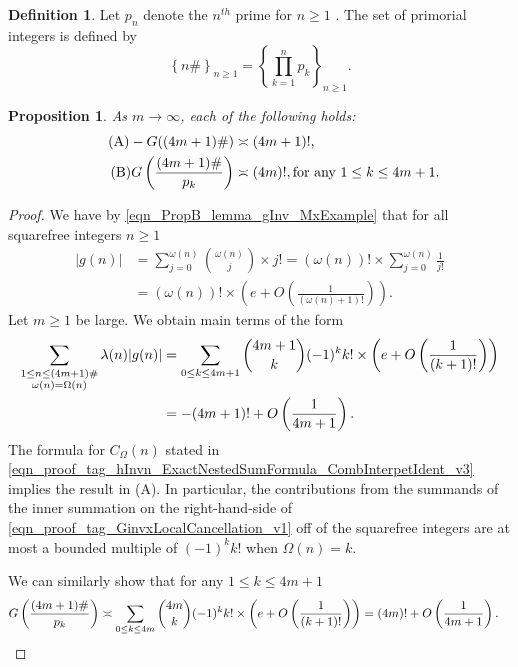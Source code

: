 \documentclass[11pt,reqno,a4letter]{article}
\numberwithin{equation}{section}
\numberwithin{figure}{section}
\numberwithin{table}{section}
\newcommand{\seqnum}[1]{\href{http://oeis.org/#1}{\color{ProcessBlue}{\underline{#1}}}}
\theoremstyle{plain}
\newtheorem{prop}[theorem]{Proposition}
\numberwithin{theorem}{section}
\theoremstyle{definition}
\newtheorem{definition}[theorem]{Definition}
\theoremstyle{remark}
\newcommand{\mathtext}[1]{\text{\rm #1}}
\begin{document}
\begin{definition}
Let $p_n$ denote the $n^{th}$ prime for $n \geq 1$ 
\cite[\seqnum{A000040}]{OEIS}. 
The set of primorial integers is defined by  
\cite[\seqnum{A002110}]{OEIS} 
\[
\left\{n\#\right\}_{n \geq 1} = \left\{\prod_{k=1}^{n} p_k\right\}_{n \geq 1}. 
\]
\end{definition}

\begin{prop}
\label{theorem_PrimorialSeqGInvCalcs_v1} 
As $m \rightarrow \infty$, each of the following holds: 
\begin{align} 
\tag{A} 
-G((4m+1)\#) & \asymp (4m+1)!, \\ 
\tag{B} 
G\left(\frac{(4m+1)\#}{p_k}\right) & \asymp (4m)!, 
     \mathtext{ for any } 1 \leq k \leq 4m+1. 
\end{align} 
\end{prop}
\begin{proof} 
We have by \eqref{eqn_PropB_lemma_gInv_MxExample} 
that for all squarefree integers $n \geq 1$ 
\begin{align*} 
|g(n)| & = \sum_{j=0}^{\omega(n)} \binom{\omega(n)}{j} \times j! 
     = (\omega(n))! \times \sum_{j=0}^{\omega(n)} \frac{1}{j!} \\ 
     & = (\omega(n))! \times \left(e + O\left(\frac{1}{(\omega(n)+1)!}\right)\right). 
\end{align*} 
Let $m \geq 1$ be large. 
We obtain main terms of the form 
\begin{align} 
\label{eqn_proof_tag_GinvxLocalCancellation_v1} 
\sum_{\substack{1 \leq n \leq (4m+1)\# \\ \omega(n)=\Omega(n)}} \lambda(n) |g(n)| 
     & = \sum_{0 \leq k \leq 4m+1} \binom{4m+1}{k} (-1)^{k} k! \times 
     \left(e + O\left(\frac{1}{(k+1)!}\right)\right) \\ 
\notag 
     & = -(4m+1)! + O\left(\frac{1}{4m+1}\right). 
\end{align} 
The formula for $C_{\Omega}(n)$ stated in 
\eqref{eqn_proof_tag_hInvn_ExactNestedSumFormula_CombInterpetIdent_v3} 
implies the result in (A). 
In particular, the contributions from the summands of the inner 
summation on the right-hand-side of 
\eqref{eqn_proof_tag_GinvxLocalCancellation_v1} 
off of the squarefree integers 
are at most a bounded multiple of $(-1)^k k!$ when $\Omega(n) = k$. 

We can similarly show that for any $1 \leq k \leq 4m+1$ 
\begin{align*}
G\left(\frac{(4m+1)\#}{p_k}\right) & \asymp \sum_{0 \leq k \leq 4m} \binom{4m}{k} (-1)^{k} k! 
     \times \left(e + O\left(\frac{1}{(k+1)!}\right)\right) = (4m)! + O\left(\frac{1}{4m+1}\right). 
     \qedhere 
\end{align*}
\end{proof}
\end{document}
